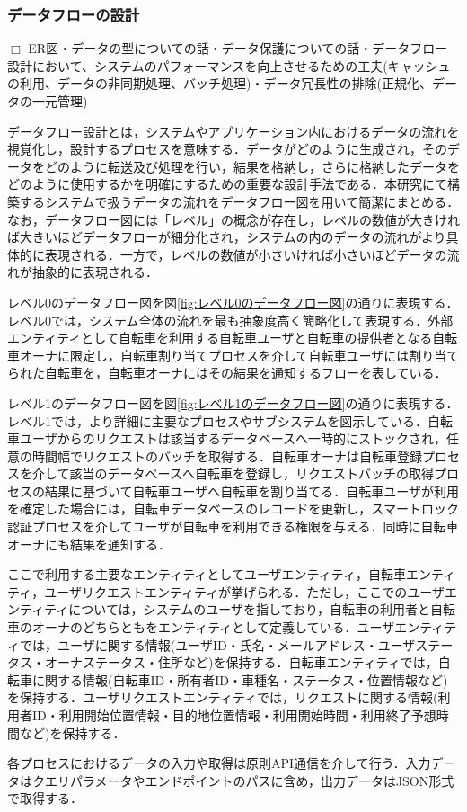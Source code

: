       \subsubsection{データフローの設計}
        \label{sec:データフローの設計}
          \par $\Box$ ER図・データの型についての話・データ保護についての話・データフロー設計において、システムのパフォーマンスを向上させるための工夫(キャッシュの利用、データの非同期処理、バッチ処理)・データ冗長性の排除(正規化、データの一元管理)
          \par データフロー設計とは，システムやアプリケーション内におけるデータの流れを視覚化し，設計するプロセスを意味する．データがどのように生成され，そのデータをどのように転送及び処理を行い，結果を格納し，さらに格納したデータをどのように使用するかを明確にするための重要な設計手法である．本研究にて構築するシステムで扱うデータの流れをデータフロー図を用いて簡潔にまとめる．なお，データフロー図には「レベル」の概念が存在し，レベルの数値が大きければ大きいほどデータフローが細分化され，システムの内のデータの流れがより具体的に表現される．一方で，レベルの数値が小さいければ小さいほどデータの流れが抽象的に表現される．
          \par レベル0のデータフロー図を図\ref{fig:レベル0のデータフロー図}の通りに表現する．レベル0では，システム全体の流れを最も抽象度高く簡略化して表現する．外部エンティティとして自転車を利用する自転車ユーザと自転車の提供者となる自転車オーナに限定し，自転車割り当てプロセスを介して自転車ユーザには割り当てられた自転車を，自転車オーナにはその結果を通知するフローを表している．
          \par レベル1のデータフロー図を図\ref{fig:レベル1のデータフロー図}の通りに表現する．レベル1では，より詳細に主要なプロセスやサブシステムを図示している．自転車ユーザからのリクエストは該当するデータベースへ一時的にストックされ，任意の時間幅でリクエストのバッチを取得する．自転車オーナは自転車登録プロセスを介して該当のデータベースへ自転車を登録し，リクエストバッチの取得プロセスの結果に基づいて自転車ユーザへ自転車を割り当てる．自転車ユーザが利用を確定した場合には，自転車データベースのレコードを更新し，スマートロック認証プロセスを介してユーザが自転車を利用できる権限を与える．同時に自転車オーナにも結果を通知する．
          \par ここで利用する主要なエンティティとしてユーザエンティティ，自転車エンティティ，ユーザリクエストエンティティが挙げられる．ただし，ここでのユーザエンティティについては，システムのユーザを指しており，自転車の利用者と自転車のオーナのどちらともをエンティティとして定義している．ユーザエンティティでは，ユーザに関する情報(ユーザID・氏名・メールアドレス・ユーザステータス・オーナステータス・住所など)を保持する．自転車エンティティでは，自転車に関する情報(自転車ID・所有者ID・車種名・ステータス・位置情報など)を保持する．ユーザリクエストエンティティでは，リクエストに関する情報(利用者ID・利用開始位置情報・目的地位置情報・利用開始時間・利用終了予想時間など)を保持する．
          \par 各プロセスにおけるデータの入力や取得は原則API通信を介して行う．入力データはクエリパラメータやエンドポイントのパスに含め，出力データはJSON形式で取得する．

